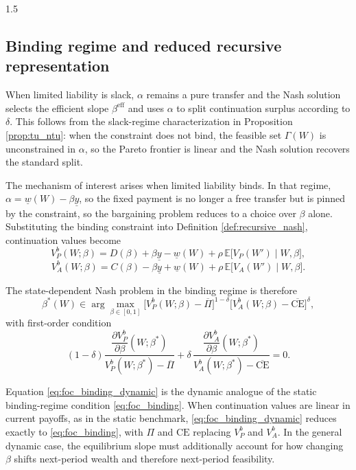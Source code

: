 \documentclass[12pt]{article}
\theoremstyle{definition}
\theoremstyle{plain}
\begin{document}
\begin{spacing}{1.5}
\subsection{Binding regime and reduced recursive representation}\label{subsec:binding_dynamic}

When limited liability is slack, $\alpha$ remains a pure transfer and the Nash solution selects the efficient slope $\beta^{\mathrm{eff}}$ and uses $\alpha$ to split continuation surplus according to $\delta$. This follows from the slack-regime characterization in Proposition \ref{prop:tu_ntu}: when the constraint does not bind, the feasible set $\Gamma(W)$ is unconstrained in $\alpha$, so the Pareto frontier is linear and the Nash solution recovers the standard split.

The mechanism of interest arises when limited liability binds. In that regime, $\alpha = \underline{w}(W)-\beta \underline y$, so the fixed payment is no longer a free transfer but is pinned by the constraint, so the bargaining problem reduces to a choice over $\beta$ alone. Substituting the binding constraint into Definition \ref{def:recursive_nash}, continuation values become
\[
V_P^{b}(W;\beta)=D(\beta)+\beta \underline y-\underline{w}(W)+\rho\,\mathbb E\big[V_P(W')\mid W,\beta\big],
\]
\[
V_A^{b}(W;\beta)=C(\beta)-\beta \underline y+\underline{w}(W)+\rho\,\mathbb E\big[V_A(W')\mid W,\beta\big].
\]

The state-dependent Nash problem in the binding regime is therefore
\[
\beta^*(W)\in\arg\max_{\beta\in[0,1]}
\Big[V_P^{b}(W;\beta)-\overline{\Pi}\Big]^{1-\delta}
\Big[V_A^{b}(W;\beta)-\overline{\text{CE}}\Big]^{\delta},
\]
with first-order condition
\begin{equation}\label{eq:foc_binding_dynamic}
(1-\delta)\frac{\dfrac{\partial V_P^{b}}{\partial\beta}(W;\beta^*)}{V_P^{b}(W;\beta^*)-\overline{\Pi}}
+
\delta\,\frac{\dfrac{\partial V_A^{b}}{\partial\beta}(W;\beta^*)}{V_A^{b}(W;\beta^*)-\overline{\text{CE}}}
=0.
\end{equation}

Equation \eqref{eq:foc_binding_dynamic} is the dynamic analogue of the static binding-regime condition \eqref{eq:foc_binding}. When continuation values are linear in current payoffs, as in the static benchmark, \eqref{eq:foc_binding_dynamic} reduces exactly to \eqref{eq:foc_binding}, with $\Pi$ and $\mathrm{CE}$ replacing $V_P^b$ and $V_A^b$. In the general dynamic case, the equilibrium slope must additionally account for how changing $\beta$ shifts next-period wealth and therefore next-period feasibility.


\end{spacing}
\end{document}
